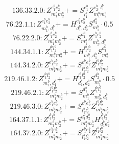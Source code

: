 \documentclass[letterpaper,10pt,fleqn,leqno,onecolumn]{article}
\begin{document}
\begin{equation} \;\;\;\;\;\;  136.33.2.0: Z^{e_{1}^{b}e_{2}^{b}}_{m_{1}^{b}m_{2}^{b}}+=S^{e_{1}^{b}}_{l_{1}^{b}}Z^{e_{2}^{b},l_{1}^{b}}_{m_{1}^{b}m_{2}^{b}} \end{equation}
\begin{equation} \;\;\;\;\;\;  76.22.1.1: Z^{e_{1}^{b}e_{2}^{b}}_{m_{1}^{b},d_{1}^{b}}+=H^{e_{1}^{b}e_{2}^{b}}_{d_{1}^{b},d_{2}^{b}}S^{d_{2}^{b}}_{m_{1}^{b}}\cdot 0.5 \end{equation}
\begin{equation} \;\;\;\;\;\;  76.22.2.0: Z^{e_{1}^{b}e_{2}^{b}}_{m_{1}^{b}m_{2}^{b}}+=S^{d_{1}^{b}}_{m_{1}^{b}}Z^{e_{1}^{b}e_{2}^{b}}_{m_{2}^{b},d_{1}^{b}} \end{equation}
\begin{equation} \;\;\;\;\;\;  144.34.1.1: Z^{l_{1}^{b}l_{2}^{b}}_{m_{1}^{b}m_{2}^{b}}+=H^{l_{1}^{b}l_{2}^{b}}_{m_{1}^{b},d_{1}^{b}}S^{d_{1}^{b}}_{m_{2}^{b}} \end{equation}
\begin{equation} \;\;\;\;\;\;  144.34.2.0: Z^{e_{1}^{b}e_{2}^{b}}_{m_{1}^{b}m_{2}^{b}}+=S^{e_{1}^{b}e_{2}^{b}}_{l_{1}^{b}l_{2}^{b}}Z^{l_{1}^{b}l_{2}^{b}}_{m_{1}^{b}m_{2}^{b}} \end{equation}
\begin{equation} \;\;\;\;\;\;  219.46.1.2: Z^{l_{1}^{b}l_{2}^{b}}_{m_{1}^{b},d_{1}^{b}}+=H^{l_{1}^{b}l_{2}^{b}}_{d_{1}^{b},d_{2}^{b}}S^{d_{2}^{b}}_{m_{1}^{b}}\cdot 0.5 \end{equation}
\begin{equation} \;\;\;\;\;\;  219.46.2.1: Z^{l_{1}^{b}l_{2}^{b}}_{m_{1}^{b}m_{2}^{b}}+=S^{d_{1}^{b}}_{m_{1}^{b}}Z^{l_{1}^{b}l_{2}^{b}}_{m_{2}^{b},d_{1}^{b}} \end{equation}
\begin{equation} \;\;\;\;\;\;  219.46.3.0: Z^{e_{1}^{b}e_{2}^{b}}_{m_{1}^{b}m_{2}^{b}}+=S^{e_{1}^{b}e_{2}^{b}}_{l_{1}^{b}l_{2}^{b}}Z^{l_{1}^{b}l_{2}^{b}}_{m_{1}^{b}m_{2}^{b}} \end{equation}
\begin{equation} \;\;\;\;\;\;  164.37.1.1: Z^{l_{1}^{b}l_{2}^{b}}_{m_{1}^{b}m_{2}^{b}}+=S^{d_{1}^{b}d_{2}^{b}}_{m_{1}^{b}m_{2}^{b}}H^{l_{1}^{b}l_{2}^{b}}_{d_{1}^{b}d_{2}^{b}} \end{equation}
\begin{equation} \;\;\;\;\;\;  164.37.2.0: Z^{e_{1}^{b}e_{2}^{b}}_{m_{1}^{b}m_{2}^{b}}+=S^{e_{1}^{b}e_{2}^{b}}_{l_{1}^{b}l_{2}^{b}}Z^{l_{1}^{b}l_{2}^{b}}_{m_{1}^{b}m_{2}^{b}} \end{equation}
\end{document}
